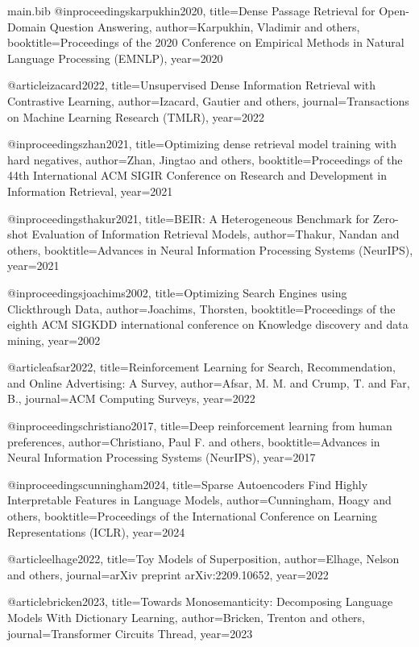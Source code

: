 \begin{filecontents*}{main.bib}
@inproceedings{karpukhin2020,
  title={Dense Passage Retrieval for Open-Domain Question Answering},
  author={Karpukhin, Vladimir and others},
  booktitle={Proceedings of the 2020 Conference on Empirical Methods in Natural Language Processing (EMNLP)},
  year={2020}
}

@article{izacard2022,
  title={Unsupervised Dense Information Retrieval with Contrastive Learning},
  author={Izacard, Gautier and others},
  journal={Transactions on Machine Learning Research (TMLR)},
  year={2022}
}

@inproceedings{zhan2021,
  title={Optimizing dense retrieval model training with hard negatives},
  author={Zhan, Jingtao and others},
  booktitle={Proceedings of the 44th International ACM SIGIR Conference on Research and Development in Information Retrieval},
  year={2021}
}

@inproceedings{thakur2021,
  title={BEIR: A Heterogeneous Benchmark for Zero-shot Evaluation of Information Retrieval Models},
  author={Thakur, Nandan and others},
  booktitle={Advances in Neural Information Processing Systems (NeurIPS)},
  year={2021}
}

@inproceedings{joachims2002,
  title={Optimizing Search Engines using Clickthrough Data},
  author={Joachims, Thorsten},
  booktitle={Proceedings of the eighth ACM SIGKDD international conference on Knowledge discovery and data mining},
  year={2002}
}

@article{afsar2022,
  title={Reinforcement Learning for Search, Recommendation, and Online Advertising: A Survey},
  author={Afsar, M. M. and Crump, T. and Far, B.},
  journal={ACM Computing Surveys},
  year={2022}
}

@inproceedings{christiano2017,
  title={Deep reinforcement learning from human preferences},
  author={Christiano, Paul F. and others},
  booktitle={Advances in Neural Information Processing Systems (NeurIPS)},
  year={2017}
}

@inproceedings{cunningham2024,
  title={Sparse Autoencoders Find Highly Interpretable Features in Language Models},
  author={Cunningham, Hoagy and others},
  booktitle={Proceedings of the International Conference on Learning Representations (ICLR)},
  year={2024}
}

@article{elhage2022,
  title={Toy Models of Superposition},
  author={Elhage, Nelson and others},
  journal={arXiv preprint arXiv:2209.10652},
  year={2022}
}

@article{bricken2023,
  title={Towards Monosemanticity: Decomposing Language Models With Dictionary Learning},
  author={Bricken, Trenton and others},
  journal={Transformer Circuits Thread},
  year={2023}
}


\end{filecontents*}
